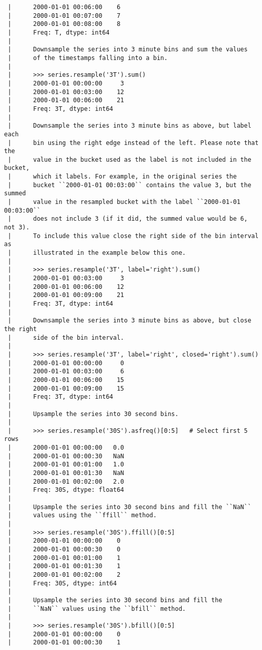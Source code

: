 \documentclass[
  letterpaper,
  DIV=11,
  numbers=noendperiod]{scrreprt}
\begin{document}
\begin{verbatim}
 |      2000-01-01 00:06:00    6
 |      2000-01-01 00:07:00    7
 |      2000-01-01 00:08:00    8
 |      Freq: T, dtype: int64
 |      
 |      Downsample the series into 3 minute bins and sum the values
 |      of the timestamps falling into a bin.
 |      
 |      >>> series.resample('3T').sum()
 |      2000-01-01 00:00:00     3
 |      2000-01-01 00:03:00    12
 |      2000-01-01 00:06:00    21
 |      Freq: 3T, dtype: int64
 |      
 |      Downsample the series into 3 minute bins as above, but label each
 |      bin using the right edge instead of the left. Please note that the
 |      value in the bucket used as the label is not included in the bucket,
 |      which it labels. For example, in the original series the
 |      bucket ``2000-01-01 00:03:00`` contains the value 3, but the summed
 |      value in the resampled bucket with the label ``2000-01-01 00:03:00``
 |      does not include 3 (if it did, the summed value would be 6, not 3).
 |      To include this value close the right side of the bin interval as
 |      illustrated in the example below this one.
 |      
 |      >>> series.resample('3T', label='right').sum()
 |      2000-01-01 00:03:00     3
 |      2000-01-01 00:06:00    12
 |      2000-01-01 00:09:00    21
 |      Freq: 3T, dtype: int64
 |      
 |      Downsample the series into 3 minute bins as above, but close the right
 |      side of the bin interval.
 |      
 |      >>> series.resample('3T', label='right', closed='right').sum()
 |      2000-01-01 00:00:00     0
 |      2000-01-01 00:03:00     6
 |      2000-01-01 00:06:00    15
 |      2000-01-01 00:09:00    15
 |      Freq: 3T, dtype: int64
 |      
 |      Upsample the series into 30 second bins.
 |      
 |      >>> series.resample('30S').asfreq()[0:5]   # Select first 5 rows
 |      2000-01-01 00:00:00   0.0
 |      2000-01-01 00:00:30   NaN
 |      2000-01-01 00:01:00   1.0
 |      2000-01-01 00:01:30   NaN
 |      2000-01-01 00:02:00   2.0
 |      Freq: 30S, dtype: float64
 |      
 |      Upsample the series into 30 second bins and fill the ``NaN``
 |      values using the ``ffill`` method.
 |      
 |      >>> series.resample('30S').ffill()[0:5]
 |      2000-01-01 00:00:00    0
 |      2000-01-01 00:00:30    0
 |      2000-01-01 00:01:00    1
 |      2000-01-01 00:01:30    1
 |      2000-01-01 00:02:00    2
 |      Freq: 30S, dtype: int64
 |      
 |      Upsample the series into 30 second bins and fill the
 |      ``NaN`` values using the ``bfill`` method.
 |      
 |      >>> series.resample('30S').bfill()[0:5]
 |      2000-01-01 00:00:00    0
 |      2000-01-01 00:00:30    1

\end{verbatim}
\end{document}

